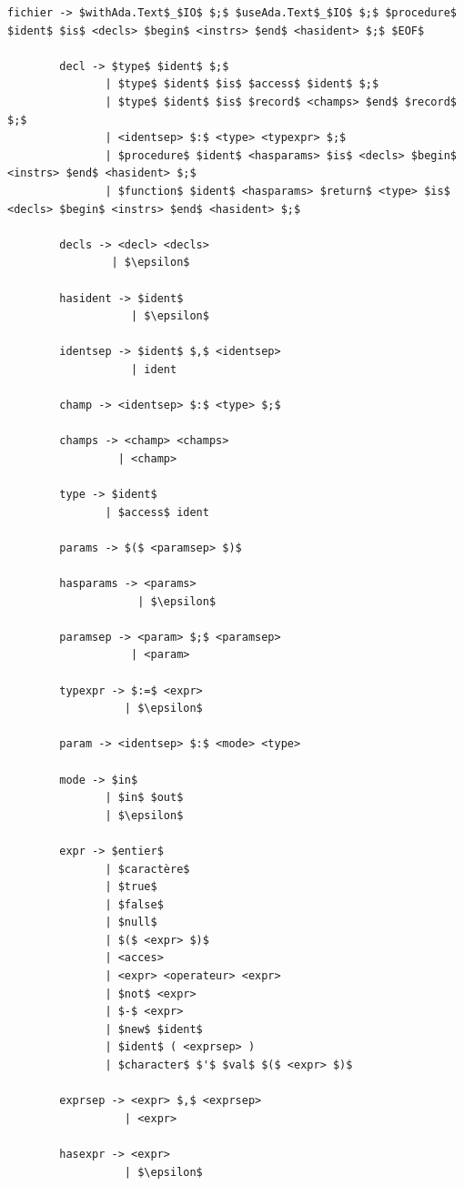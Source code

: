 \documentclass[french,a4paper]{article}
\begin{document}
    \begin{lstlisting}[keywordstyle=\color{black},label={lst:lstlisting}]
        fichier -> $withAda.Text$_$IO$ $;$ $useAda.Text$_$IO$ $;$ $procedure$ $ident$ $is$ <decls> $begin$ <instrs> $end$ <hasident> $;$ $EOF$

        decl -> $type$ $ident$ $;$
               | $type$ $ident$ $is$ $access$ $ident$ $;$
               | $type$ $ident$ $is$ $record$ <champs> $end$ $record$ $;$
               | <identsep> $:$ <type> <typexpr> $;$
               | $procedure$ $ident$ <hasparams> $is$ <decls> $begin$ <instrs> $end$ <hasident> $;$
               | $function$ $ident$ <hasparams> $return$ <type> $is$ <decls> $begin$ <instrs> $end$ <hasident> $;$

        decls -> <decl> <decls>
                | $\epsilon$

        hasident -> $ident$
                   | $\epsilon$

        identsep -> $ident$ $,$ <identsep>
                   | ident

        champ -> <identsep> $:$ <type> $;$

        champs -> <champ> <champs>
                 | <champ>

        type -> $ident$
               | $access$ ident

        params -> $($ <paramsep> $)$

        hasparams -> <params>
                    | $\epsilon$

        paramsep -> <param> $;$ <paramsep>
                   | <param>

        typexpr -> $:=$ <expr>
                  | $\epsilon$

        param -> <identsep> $:$ <mode> <type>

        mode -> $in$
               | $in$ $out$
               | $\epsilon$

        expr -> $entier$
               | $caractère$
               | $true$
               | $false$
               | $null$
               | $($ <expr> $)$
               | <acces>
               | <expr> <operateur> <expr>
               | $not$ <expr>
               | $-$ <expr>
               | $new$ $ident$
               | $ident$ ( <exprsep> )
               | $character$ $'$ $val$ $($ <expr> $)$

        exprsep -> <expr> $,$ <exprsep>
                  | <expr>

        hasexpr -> <expr>
                  | $\epsilon$


\end{lstlisting}
\end{document}
